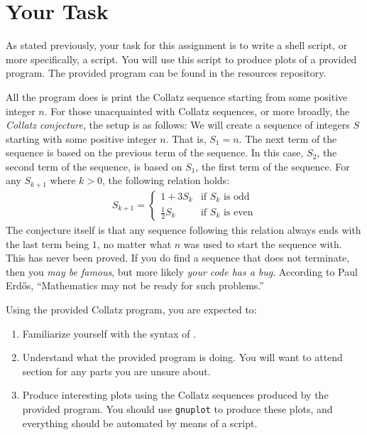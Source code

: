 \section{Your Task}

As stated previously, your task for this assignment is to write a shell script,
or more specifically, a \Bash{} script. You will use this script to
produce plots of a provided \C{} program. The provided program can be
found in the resources repository.

All the program does is print the Collatz sequence starting from some positive
integer $n$. For those unacquainted with Collatz sequences, or more broadly, the
\emph{Collatz conjecture}, the setup is as follows: We will create a sequence of
integers $S$ starting with some positive integer $n$. That is, $S_1 = n$. The
next term of the sequence is based on the previous term of the sequence. In this
case, $S_2$, the second term of the sequence, is based on $S_1$, the first term
of the sequence. For any $S_{k+1}$ where $k > 0$, the following relation holds:
$$
\begin{aligned}
S_{k+1} =
  \begin{cases}
    1+3S_k  &\text{if $S_k$ is odd} \\
    \frac{1}{2}S_k &\text{if $S_k$ is even}
  \end{cases}
\end{aligned}
$$
The conjecture itself is that any sequence following this relation always ends
with the last term being $1$, no matter what $n$ was used to start the sequence
with. This has never been proved. If you do find a sequence that does not terminate, then you \emph{may be famous}, but more likely \emph{your code has a bug}.
According to Paul Erd\H{o}s, ``Mathematics may
not be ready for such problems.''

Using the provided Collatz program, you are expected to:
\begin{enumerate}
  \item Familiarize yourself with the syntax of \C{}.
  \item Understand what the provided program is doing. You will want to attend
    section for any parts you are unsure about.
  \item Produce interesting plots using the Collatz sequences produced by the
    provided program. You should use \texttt{gnuplot} to produce these plots,
    and everything should be automated by means of a \Bash{} script.
\end{enumerate}

